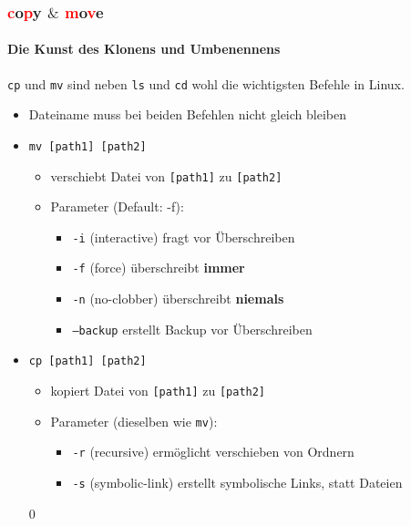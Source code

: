 \documentclass[12pt,utf8]{beamer}
\begin{document}
\begin{frame}
\frametitle{\textcolor{red}{c}o\textcolor{red}{p}y $\&$ \textcolor{red}{m}o\textcolor{red}{v}e}
\framesubtitle{\textcolor{ownDarkOr}{Die Kunst des Klonens und Umbenennens}}
\texttt{cp} und \texttt{mv} sind neben \texttt{ls} und \texttt{cd} wohl die wichtigsten Befehle in Linux.
\begin{itemize}
	\item Dateiname muss bei beiden Befehlen nicht gleich bleiben
	\item \texttt{mv [path1] [path2]}
	\begin{itemize}
		\item verschiebt Datei von \texttt{[path1]} zu \texttt{[path2]}
		\item Parameter (Default: -f):
		\begin{itemize}[<+->]
			\item {\scriptsize \texttt{-i} (interactive) fragt vor Überschreiben}
			\item {\scriptsize \texttt{-f} (force) überschreibt \textbf{immer}}
			\item {\scriptsize \texttt{-n} (no-clobber) überschreibt \textbf{niemals}}
			\item {\scriptsize \texttt{--backup} erstellt Backup vor Überschreiben}
		\end{itemize}
	\end{itemize}
	\item \texttt{cp [path1] [path2]}
	\begin{itemize}
		\item kopiert Datei von \texttt{[path1]} zu \texttt{[path2]}
		\item Parameter {\scriptsize (dieselben wie \texttt{mv})}:
		\begin{itemize}[<+->]
			\item {\scriptsize \texttt{-r} (recursive) ermöglicht verschieben von Ordnern}
			\item {\scriptsize \texttt{-s} (symbolic-link) erstellt symbolische Links, statt Dateien}
		\end{itemize}
	\end{itemize}0
\end{itemize}
\end{frame}
\end{document}
